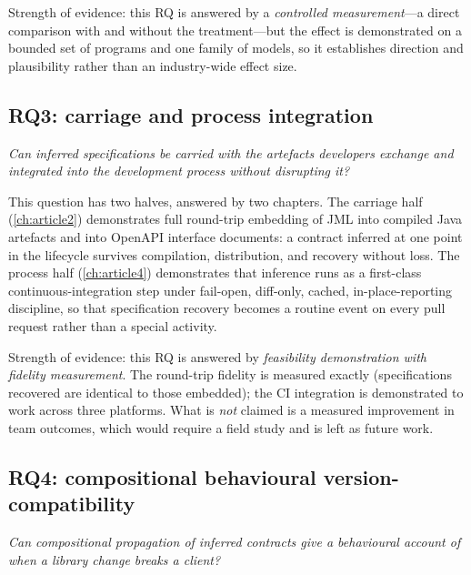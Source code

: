 Strength of evidence: this RQ is answered by a \emph{controlled measurement}---a
direct comparison with and without the treatment---but the effect is demonstrated
on a bounded set of programs and one family of models, so it establishes
direction and plausibility rather than an industry-wide effect size.

\subsection{RQ3: carriage and process integration}

\emph{Can inferred specifications be carried with the artefacts developers exchange
and integrated into the development process without disrupting it?}

This question has two halves, answered by two chapters. The carriage half
(\cref{ch:article2}) demonstrates full round-trip embedding of JML into compiled
Java artefacts and into OpenAPI interface documents: a contract inferred at one
point in the lifecycle survives compilation, distribution, and recovery without
loss. The process half (\cref{ch:article4}) demonstrates that inference runs as a
first-class continuous-integration step under fail-open, diff-only, cached,
in-place-reporting discipline, so that specification recovery becomes a routine
event on every pull request rather than a special activity.

Strength of evidence: this RQ is answered by \emph{feasibility demonstration with
fidelity measurement}. The round-trip fidelity is measured exactly (specifications
recovered are identical to those embedded); the CI integration is demonstrated to
work across three platforms. What is \emph{not} claimed is a measured improvement
in team outcomes, which would require a field study and is left as future work.

\subsection{RQ4: compositional behavioural version-compatibility}

\emph{Can compositional propagation of inferred contracts give a behavioural
account of when a library change breaks a client?}

